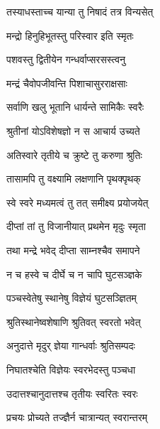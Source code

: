 {तस्याधस्ताच्च यान्या तु निषादं तत्र विन्यसेत्}

{मन्द्रो हिनुहिभूतस्तु परिस्वार इति स्मृतः}

{पशवस्तु द्वितीयेन गन्धर्वाप्सरसस्त्वनु}

{मन्द्रं चैवोपजीवन्ति पिशाचासुरराक्षसाः}

{सर्वाणि खलु भूतानि धार्यन्ते सामिकैः स्वरैः}

{श्रुतीनां योऽविशेषज्ञो न स आचार्य उच्यते}

{अतिस्वारे तृतीये च क्रुष्टे तु करुणा श्रुतिः}

{तासामपि तु वक्ष्यामि लक्षणानि पृथक्पृथक्}

{स्वे स्वरे मध्यमत्वं तु तत् समीक्ष्य प्रयोजयेत्}

{दीप्तां तां तु विजानीयात् प्रथमेन मृदुः स्मृता}

{तथा मन्द्रे भवेद् दीप्ता साम्नश्चैव समापने}

{न च हस्वे च दीर्घे च न चापि घुटसञ्ज्ञके}

{पञ्चस्वेतेषु स्थानेषु विज्ञेयं घुटसञ्ज्ञितम्}

{श्रुतिस्थानेष्वशेषाणि श्रुतिवत् स्वरतो भवेत्}

{अनुदात्ते मृदुर् ज्ञेया गान्धर्वाः श्रुतिसम्पदः}

{निघातश्चेति विज्ञेयः स्वरभेदस्तु पञ्चधा}

\closesub

\resetShloka

{उदात्तश्चानुदात्तश्च तृतीयः स्वरितः स्वरः}

{प्रचयः प्रोच्यते तज्ज्ञैर्न चात्रान्यत् स्वरान्तरम्}

